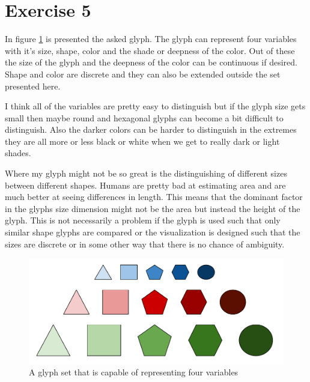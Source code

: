 \documentclass{article}
\begin{document}
\newpage 

\section*{Exercise 5}  

In figure \ref{glyphs} is presented the asked glyph. The glyph can represent four variables with it's size, shape, color and the shade or deepness of the color. Out of these the size of the glyph and the deepness of the color can be continuous if desired. Shape and color are discrete and they can also be extended outside the set presented here. 

I think all of the variables are pretty easy to distinguish but if the glyph size gets small then maybe round and hexagonal glyphs can become a bit difficult to distinguish. Also the darker colors can be harder to distinguish in the extremes they are all more or less black or white when we get to really dark or light shades. 

Where my glyph might not be so great is the distinguishing of different sizes between different shapes. Humans are pretty bad at estimating area and are much better at seeing differences in length. This means that the dominant factor in the glyphs size dimension might not be the area but instead the height of the glyph. This is not necessarily a problem if the glyph is used such that only similar shape glyphs are compared or the visualization is designed such that the sizes are discrete or in some other way that there is no chance of ambiguity.
\begin{figure}[h!]
	\centering
	\includegraphics[width = \linewidth]{glyphs}
	\caption{A glyph set that is capable of representing four variables}
	\label{glyphs}
\end{figure}
\end{document}
